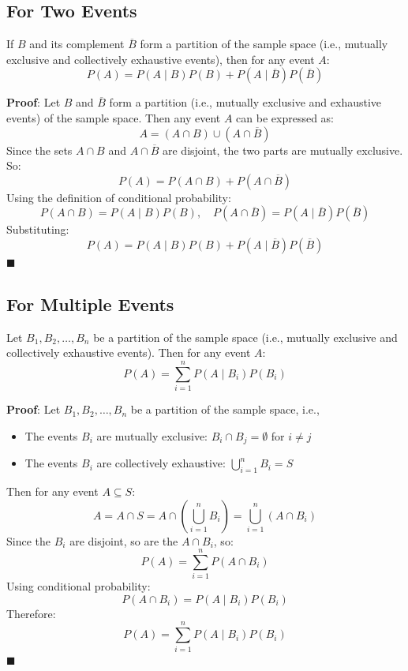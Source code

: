 \documentclass[twoside]{book}
\begin{document}
\subsection{For Two Events}
\begin{textbox}
    If \( B \) and its complement \( \overline{B} \) form a partition of the sample space (i.e., mutually exclusive and collectively exhaustive events), then for any event \( A \):
\[
P(A) = P(A \mid B)P(B) + P(A \mid \overline{B})P(\overline{B})
\]
\end{textbox}
\textbf{Proof}: Let \( B \) and \( \overline{B} \) form a partition (i.e., mutually exclusive and exhaustive events) of the sample space. Then any event \( A \) can be expressed as:
\[
A = (A \cap B) \cup (A \cap \overline{B})
\]
Since the sets \( A \cap B \) and \( A \cap \overline{B} \) are disjoint, the two parts are mutually exclusive. So:
\[
P(A) = P(A \cap B) + P(A \cap \overline{B})
\]
Using the definition of conditional probability:
\[
P(A \cap B) = P(A \mid B)P(B), \quad P(A \cap \overline{B}) = P(A \mid \overline{B})P(\overline{B})
\]
Substituting:
\[
P(A) = P(A \mid B)P(B) + P(A \mid \overline{B})P(\overline{B})
\]
\hfill\(\blacksquare\)

\subsection{For Multiple Events}

\begin{textbox}

Let \( B_1, B_2, \dots, B_n \) be a partition of the sample space (i.e., mutually exclusive and collectively exhaustive events). Then for any event \( A \):
\[
P(A) = \sum_{i=1}^{n} P(A \mid B_i)P(B_i)
\]
\end{textbox}

\textbf{Proof}: Let \( B_1, B_2, \dots, B_n \) be a partition of the sample space, i.e.,

\begin{itemize}
    \item The events \( B_i \) are mutually exclusive: \( B_i \cap B_j = \emptyset \) for \( i \ne j \)
    \item The events \( B_i \) are collectively exhaustive: \( \bigcup_{i=1}^n B_i = S \)
\end{itemize}

Then for any event \( A \subseteq S \):
\[
A = A \cap S = A \cap \left( \bigcup_{i=1}^n B_i \right) = \bigcup_{i=1}^n (A \cap B_i)
\]
Since the \( B_i \) are disjoint, so are the \( A \cap B_i \), so:
\[
P(A) = \sum_{i=1}^n P(A \cap B_i)
\]
Using conditional probability:
\[
P(A \cap B_i) = P(A \mid B_i)P(B_i)
\]
Therefore:
\[
P(A) = \sum_{i=1}^n P(A \mid B_i)P(B_i)
\]
\hfill\(\blacksquare\)
\end{document}
